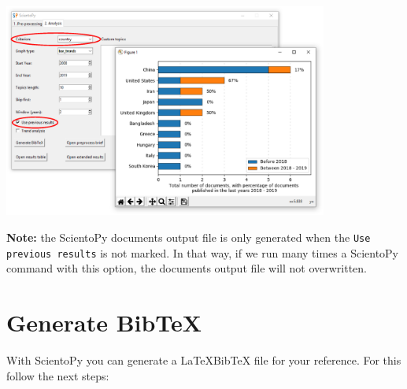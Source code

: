 \documentclass[10pt,letterpaper]{article}
\begin{document}
\begin{center}
	\includegraphics[width=0.8\textwidth]{./figures/win_analysis9.eps}
\end{center}

\textbf{Note:} the ScientoPy documents output file is only generated when the \verb|Use previous results| is not marked. In that way, if we run many times a ScientoPy command with this option, the documents output file will not overwritten.

\section{Generate BibTeX}

With ScientoPy you can generate a \LaTeX BibTeX file for your reference. For this follow the next steps:
\end{document}

